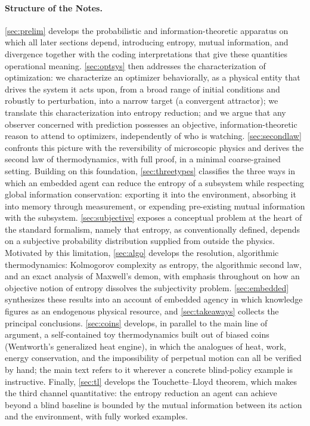 \documentclass[11pt]{article}
\begin{document}
\paragraph{Structure of the Notes.} \cref{sec:prelim} develops the probabilistic and information-theoretic apparatus on which all later sections depend, introducing entropy, mutual information, and divergence together with the coding interpretations that give these quantities operational meaning. \cref{sec:optsys} then addresses the characterization of optimization: we characterize an optimizer behaviorally, as a physical entity that drives the system it acts upon, from a broad range of initial conditions and robustly to perturbation, into a narrow target (a convergent attractor); we translate this characterization into entropy reduction; and we argue that any observer concerned with prediction possesses an objective, information-theoretic reason to attend to optimizers, independently of who is watching. \cref{sec:secondlaw} confronts this picture with the reversibility of microscopic physics and derives the second law of thermodynamics, with full proof, in a minimal coarse-grained setting. Building on this foundation, \cref{sec:threetypes} classifies the three ways in which an embedded agent can reduce the entropy of a subsystem while respecting global information conservation: exporting it into the environment, absorbing it into memory through measurement, or expending pre-existing mutual information with the subsystem. \cref{sec:subjective} exposes a conceptual problem at the heart of the standard formalism, namely that entropy, as conventionally defined, depends on a subjective probability distribution supplied from outside the physics. Motivated by this limitation, \cref{sec:algo} develops the resolution, algorithmic thermodynamics: Kolmogorov complexity as entropy, the algorithmic second law, and an exact analysis of Maxwell's demon, with emphasis throughout on how an objective notion of entropy dissolves the subjectivity problem. \cref{sec:embedded} synthesizes these results into an account of embedded agency in which knowledge figures as an endogenous physical resource, and \cref{sec:takeaways} collects the principal conclusions. \cref{sec:coins} develops, in parallel to the main line of argument, a self-contained toy thermodynamics built out of biased coins (Wentworth's generalized heat engine), in which the analogues of heat, work, energy conservation, and the impossibility of perpetual motion can all be verified by hand; the main text refers to it wherever a concrete blind-policy example is instructive. Finally, \cref{sec:tl} develops the Touchette--Lloyd theorem, which makes the third channel quantitative: the entropy reduction an agent can achieve beyond a blind baseline is bounded by the mutual information between its action and the environment, with fully worked examples.
\end{document}

